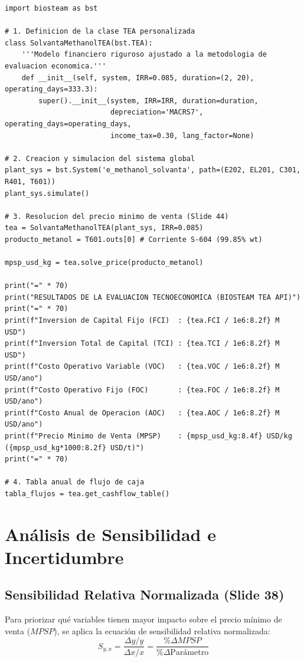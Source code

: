 \documentclass[11pt,letterpaper]{article}
\begin{document}
\begin{lstlisting}[caption={Script de resolucion de TEA y precio minimo en BioSTEAM}]
import biosteam as bst

# 1. Definicion de la clase TEA personalizada
class SolvantaMethanolTEA(bst.TEA):
    '''Modelo financiero riguroso ajustado a la metodologia de evaluacion economica.'''
    def __init__(self, system, IRR=0.085, duration=(2, 20), operating_days=333.3):
        super().__init__(system, IRR=IRR, duration=duration,
                         depreciation='MACRS7', operating_days=operating_days,
                         income_tax=0.30, lang_factor=None)

# 2. Creacion y simulacion del sistema global
plant_sys = bst.System('e_methanol_solvanta', path=(E202, EL201, C301, R401, T601))
plant_sys.simulate()

# 3. Resolucion del precio minimo de venta (Slide 44)
tea = SolvantaMethanolTEA(plant_sys, IRR=0.085)
producto_metanol = T601.outs[0] # Corriente S-604 (99.85% wt)

mpsp_usd_kg = tea.solve_price(producto_metanol)

print("=" * 70)
print("RESULTADOS DE LA EVALUACION TECNOECONOMICA (BIOSTEAM TEA API)")
print("=" * 70)
print(f"Inversion de Capital Fijo (FCI)  : {tea.FCI / 1e6:8.2f} M USD")
print(f"Inversion Total de Capital (TCI) : {tea.TCI / 1e6:8.2f} M USD")
print(f"Costo Operativo Variable (VOC)   : {tea.VOC / 1e6:8.2f} M USD/ano")
print(f"Costo Operativo Fijo (FOC)       : {tea.FOC / 1e6:8.2f} M USD/ano")
print(f"Costo Anual de Operacion (AOC)   : {tea.AOC / 1e6:8.2f} M USD/ano")
print(f"Precio Minimo de Venta (MPSP)    : {mpsp_usd_kg:8.4f} USD/kg ({mpsp_usd_kg*1000:8.2f} USD/t)")
print("=" * 70)

# 4. Tabla anual de flujo de caja
tabla_flujos = tea.get_cashflow_table()
\end{lstlisting}

\newpage

\section{Análisis de Sensibilidad e Incertidumbre}

\subsection{Sensibilidad Relativa Normalizada (Slide 38)}
Para priorizar qué variables tienen mayor impacto sobre el precio mínimo de venta ($MPSP$), se aplica la ecuación de sensibilidad relativa normalizada:
\begin{equation}
    S_{y,x} = \frac{\Delta y / y}{\Delta x / x} = \frac{\% \Delta MPSP}{\% \Delta \text{Parámetro}}
\end{equation}
\end{document}
